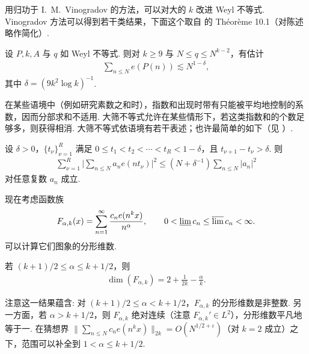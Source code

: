 用归功于 I.~M.~Vinogradov 的方法，可以对大的 $k$ 改进 Weyl 不等式. Vinogradov 方法可以得到若干类结果，下面这个取自 \cite{b184} 的 Th\'eor\`eme 10.1（对陈述略作简化）.

\begin{lemma}\label{lem:8.13}
设 $P, k, A$ 与 $q$ 如 Weyl 不等式. 则对 $k \geq 9$ 与 $N \leq q \leq N^{k-2}$，有估计
\begin{align*}
  \sum_{n\leq N}e(P(n))\lesssim N^{1-\delta},
\end{align*}
其中 $\delta = (9k^2\log k)^{-1}$.
\end{lemma}

在某些语境中（例如研究素数之和时），指数和出现时带有只能被平均地控制的系数，因而分部求和不适用. 大筛不等式允许在某些情形下，若这类指数和的个数足够多，则获得相消. 大筛不等式依语境有若干表述；也许最简单的如下（见 \cite{b172}）.

\begin{lemma}[大筛不等式]\label{lem:8.14}
设 $\delta > 0$，$\{t_\nu\}_{\nu=1}^R$ 满足 $0 \leq t_1 < t_2 < \cdots < t_R < 1 - \delta$，且 $t_{\nu+1} - t_\nu > \delta$. 则
\begin{align*}
  \sum_{\nu=1}^{R}\Big|\sum_{n\leq N}a_{n} e\left(n t_{\nu}\right)\Big|^{2}
  \leq\left(N+\delta^{-1}\right)\sum_{n\leq N}|a_{n}|^{2}
\end{align*}
对任意复数 $a_{n}$ 成立.
\end{lemma}

现在考虑函数族
\begin{align*}
  F_{\alpha,k}(x)=\sum_{n=1}^{\infty}\frac{c_{n} e(n^{k} x)}{n^{\alpha}},\qquad
  0<\varliminf c_{n}\leq\varlimsup c_{n}<\infty.
\end{align*}
可以计算它们图象的分形维数.

\begin{theorem}\label{thm:8.15}
若 $(k+1)/2 \leq \alpha \leq k+1/2$，则
\begin{align*}
  \dim(F_{\alpha,k})=2+\frac{1}{2k}-\frac{\alpha}{k}.
\end{align*}
\end{theorem}

\begin{remark}\label{rem:8.16}
注意这一结果蕴含: 对 $(k+1)/2 \leq \alpha < k+1/2$，$F_{\alpha,k}$ 的分形维数是非整数. 另一方面，若 $\alpha > k+1/2$，则 $F_{\alpha,k}$ 绝对连续（注意 $F_{\alpha,k}' \in L^2$），分形维数平凡地等于一. 在猜想界 $\|\sum_{n \leq N} c_n e(n^k x)\|_{2k} = O(N^{1/2+\varepsilon})$（对 $k = 2$ 成立）之下，范围可以补全到 $1 < \alpha \leq k+1/2$.
\end{remark}

